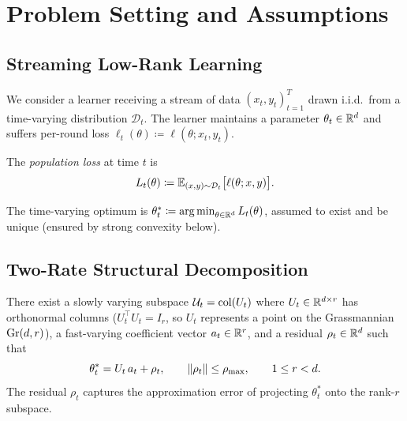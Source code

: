 \section{Problem Setting and Assumptions}
\label{sec:setting}

\subsection{Streaming Low-Rank Learning}

We consider a learner receiving a stream of data $(x_t, y_t)_{t=1}^T$
drawn i.i.d.\ from a time-varying distribution $\mathcal{D}_t$. The
learner maintains a parameter $\theta_t \in \mathbb{R}^d$ and suffers per-round
loss $\ell_t(\theta) \coloneqq \ell(\theta; x_t, y_t)$.

\begin{definition}
\label{def:population-loss}
The \emph{population loss} at time $t$ is
\[
  L_t(\theta) \coloneqq \mathbb{E}_{(x,y) \sim \mathcal{D}_t}\bigl[\ell(\theta; x, y)\bigr].
\]
\end{definition}

\begin{definition}
\label{def:optimum}
The time-varying optimum is $\theta^*_t \coloneqq \operatorname*{arg\,min}_{\theta \in \mathbb{R}^d} L_t(\theta)$,
assumed to exist and be unique (ensured by strong convexity below).
\end{definition}

\subsection{Two-Rate Structural Decomposition}

\begin{assumption}
\label{ass:decomposition}
There exist a slowly varying subspace $\mathcal{U}_t = \mathrm{col}(U_t)$ where
$U_t \in \mathbb{R}^{d \times r}$ has orthonormal columns ($U_t^\top U_t = I_r$,
so $U_t$ represents a point on the Grassmannian $\mathrm{Gr}(d,r)$), a fast-varying
coefficient vector $a_t \in \mathbb{R}^r$, and a residual $\rho_t \in \mathbb{R}^d$
such that
\[
  \theta^*_t = U_t\, a_t + \rho_t,
  \qquad
  \left\|\rho_t\right\| \leq \rho_{\max},
  \qquad
  1 \leq r < d.
\]
The residual $\rho_t$ captures the approximation error of projecting
$\theta^*_t$ onto the rank-$r$ subspace.
\end{assumption}

